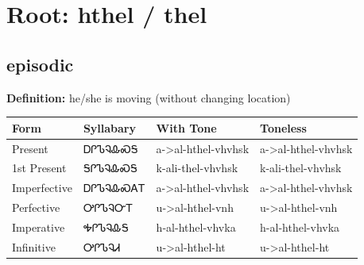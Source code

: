 \documentclass{article}%
\begin{document}
%
\normalsize%
\section*{Root: hthel / thel}%
\subsection*{episodic}%
\textbf{Definition: }%
he/she is moving (without changing location)%
\\[0.5em]%
\begin{tabular}{|l|l|l|l|}%
\hline%
\textbf{Form}&\textbf{Syllabary}&\textbf{With Tone}&\textbf{Toneless}\\%
\hline%
Present&ᎠᎵᏖᎸᎲᏍᎦ&a{-}>al{-}hthel{-}vhvhsk&a{-}>al{-}hthel{-}vhvhsk\\%
1st Present&ᎦᎵᏖᎸᎲᏍᎦ&k{-}ali{-}thel{-}vhvhsk&k{-}ali{-}thel{-}vhvhsk\\%
Imperfective&ᎠᎵᏖᎸᎲᏍᎪᎢ&a{-}>al{-}hthel{-}vhvhsk&a{-}>al{-}hthel{-}vhvhsk\\%
Perfective&ᎤᎵᏖᎸᏅᎢ&u{-}>al{-}hthel{-}vnh&u{-}>al{-}hthel{-}vnh\\%
Imperative&ᎭᎵᏖᎸᎲᎦ&h{-}al{-}hthel{-}vhvka&h{-}al{-}hthel{-}vhvka\\%
Infinitive&ᎤᎵᏖᎸᏗ&u{-}>al{-}hthel{-}ht&u{-}>al{-}hthel{-}ht\\%
\hline%
\end{tabular}%
\\[1em]%
\end{document}
